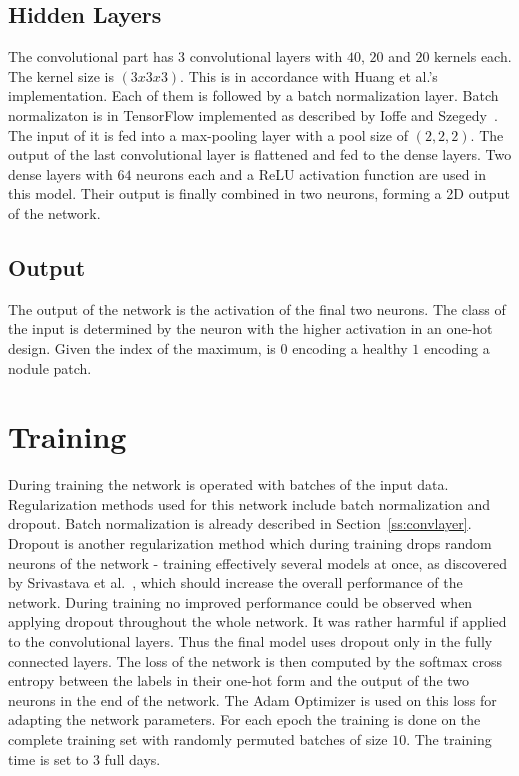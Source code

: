 \documentclass[main.tex]{subfiles}
\begin{document}
\subsection{Hidden Layers}
The convolutional part has $3$ convolutional layers with $40$, $20$ and $20$ kernels each. The kernel size is $(3x3x3)$. This is in accordance with Huang et al.'s~\cite{huang2017lung} implementation. Each of them is followed by a batch normalization layer. Batch normalizaton is in TensorFlow implemented as described by Ioffe and Szegedy~\cite{ioffe2015batch}. The input of it is fed into a max-pooling layer with a pool size of $(2,2,2)$. The output of the last convolutional layer is flattened and fed to the dense layers. Two dense layers with $64$ neurons each and a ReLU activation function are used in this model. Their output is finally combined in two neurons, forming a 2D output of the network. 


\subsection{Output}
The output of the network is the activation of the final two neurons. The class of the input is determined by the neuron with the higher activation in an one-hot design. Given the index of the maximum, is $0$ encoding a healthy $1$ encoding a nodule patch.


\section{Training}
During training the network is operated with batches of the input data. Regularization methods used for this network include batch normalization and dropout. Batch normalization is already described in Section~\ref{ss:convlayer}. Dropout is another regularization method which during training drops random neurons of the network - training effectively several models at once, as discovered by Srivastava et al.~\cite{srivastava2014dropout}, which should increase the overall performance of the network. During training no improved performance could be observed when applying dropout throughout the whole network. It was rather harmful if applied to the convolutional layers. Thus the final model uses dropout only in the fully connected  layers. The loss of the network is then computed by the softmax cross entropy between the labels in their one-hot form and the output of the two neurons in the end of the network. The Adam Optimizer is used on this loss for adapting the network parameters. For each epoch the training is done on the complete training set with randomly permuted batches of size $10$. The training time is set to 3 full days.
                                                 
\end{document}
